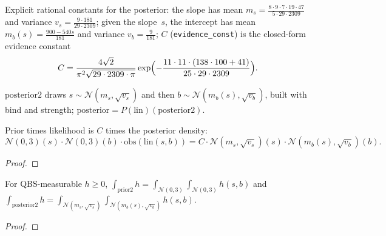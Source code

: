 \begin{definition}\label{def:post_params}
  \rocqok
  Explicit rational constants for the posterior: the slope has mean
  $m_s = \frac{8\cdot 9\cdot 7\cdot 19\cdot 47}{5\cdot 29\cdot 2309}$ and
  variance $v_s = \frac{9 \cdot 181}{29 \cdot 2309}$; given the slope~$s$,
  the intercept has mean $m_b(s) = \frac{900 - 540 s}{181}$ and variance
  $v_b = \frac{9}{181}$; $C$ (\texttt{evidence\_const}) is the closed-form evidence constant
  \[
    C = \frac{4\sqrt{2}}{\pi^2 \sqrt{29 \cdot 2309 \cdot \pi}}
    \exp\Bigl(-\frac{11 \cdot 11 \cdot (138\cdot 100 + 41)}
    {25 \cdot 29 \cdot 2309}\Bigr).
  \]
\end{definition}

\begin{definition}[Posterior]\label{def:posterior}
  \rocqok
  $\mathrm{posterior2}$ draws $s \sim \mathcal{N}(m_s, \sqrt{v_s})$ and
  then $b \sim \mathcal{N}(m_b(s), \sqrt{v_b})$, built with bind and
  strength; $\mathrm{posterior} = P(\mathrm{lin})(\mathrm{posterior2})$.
\end{definition}

\begin{lemma}\label{lem:obs_prior_factor}
  \rocqok
  Prior times likelihood is $C$ times the posterior density:
  \[
    \mathcal{N}(0,3)(s)\cdot\mathcal{N}(0,3)(b)\cdot
    \mathrm{obs}(\mathrm{lin}(s,b))
    = C \cdot \mathcal{N}(m_s, \sqrt{v_s})(s)
    \cdot \mathcal{N}(m_b(s), \sqrt{v_b})(b).
  \]
\end{lemma}
\begin{proof}\rocqok\end{proof}

\begin{lemma}\label{lem:prior_posterior_integral}
  \rocqok
  For QBS-measurable $h \geq 0$, $\int_{\mathrm{prior2}} h =
  \int_{\mathcal{N}(0,3)}\int_{\mathcal{N}(0,3)} h(s,b)$ and
  $\int_{\mathrm{posterior2}} h = \int_{\mathcal{N}(m_s,\sqrt{v_s})}
  \int_{\mathcal{N}(m_b(s),\sqrt{v_b})} h(s,b)$.
\end{lemma}
\begin{proof}\rocqok\end{proof}

